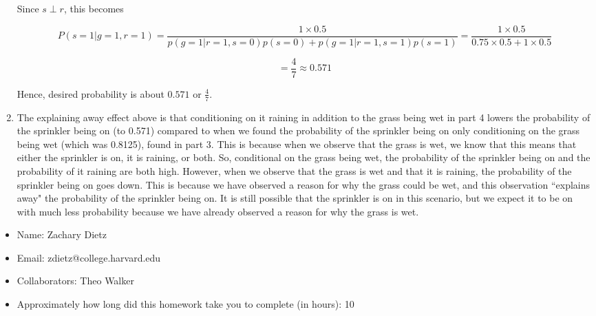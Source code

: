 \documentclass[submit]{harvardml}
\begin{document}
\begin{enumerate}
    Since $s \perp r$, this becomes 
    
    $$P(s=1| g=1, r=1) = \frac{1 \times 0.5}{p(g=1|r=1,s=0)p(s=0) + p(g=1|r=1,s=1)p(s=1) } =\frac{1 \times 0.5}{0.75 \times 0.5 + 1 \times 0.5 } $$
    
    $$= \frac{4}{7} \approx 0.571 $$  
    
    Hence, desired probability is about $\boxed{ 0.571}$ or $\frac{4}{7}$.
    
    \item The explaining away effect above is that conditioning on it raining in addition to the grass being wet in part 4 lowers the probability of the sprinkler being on (to 0.571) compared to when we found the probability of the sprinkler being on only conditioning on the grass being wet (which was 0.8125), found in part 3. This is because when we observe that the grass is wet, we know that this means that either the sprinkler is on, it is raining, or both. So, conditional on the grass being wet, the probability of the sprinkler being on and the probability of it raining are both high. However, when we observe that the grass is wet and that it is raining, the probability of the sprinkler being on goes down. This is because we have observed a reason for why the grass could be wet, and this observation ``explains away" the probability of the sprinkler being on. It is still possible that the sprinkler is on in this scenario, but we expect it to be on with much less probability because we have already observed a reason for why the grass is wet.
    
    \end{enumerate}


\newpage

\begin{itemize}
    \item Name: Zachary Dietz
    \item Email: zdietz@college.harvard.edu
    \item Collaborators: Theo Walker
    \item Approximately how long did this homework take you to complete (in hours): 10
\end{itemize}
\end{document}
